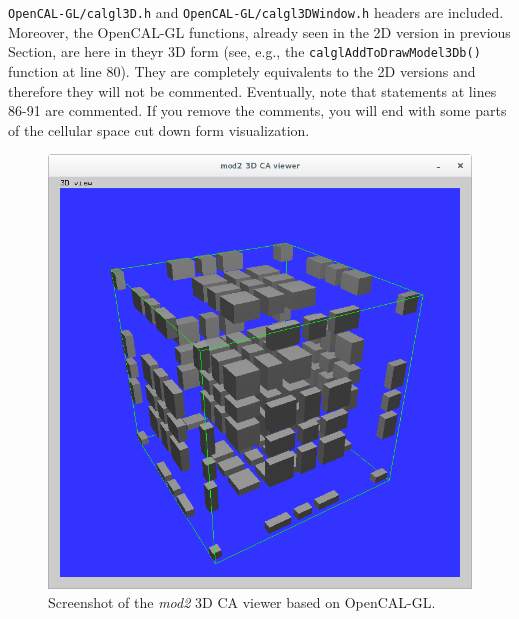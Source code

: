 \verb'OpenCAL-GL/calgl3D.h'
and \verb'OpenCAL-GL/calgl3DWindow.h' headers are included. Moreover,
the OpenCAL-GL functions, already seen in the 2D version in previous
Section, are here in theyr 3D form (see, e.g., the
\verb'calglAddToDrawModel3Db()' function at line 80). They are
completely equivalents to the 2D versions and therefore they will not
be commented. Eventually, note that statements at lines 86-91 are
commented. If you remove the comments, you will end with some parts of
the cellular space cut down form visualization.

\begin{figure}
  \begin{center}
    \includegraphics[width=12cm]{./images/OpenCAL/calgl_mod2}
    \caption{Screenshot of the \emph{mod2} 3D CA viewer based on
      OpenCAL-GL.}
    \label{fig:calgl_mod2}
  \end{center}
\end{figure}
